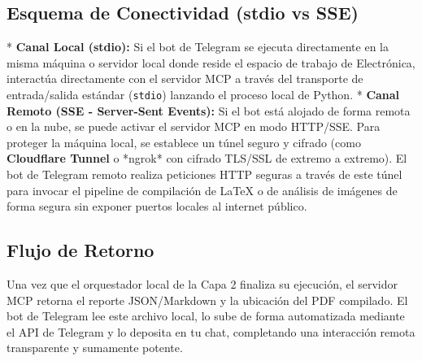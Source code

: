 \documentclass[12pt,a4paper]{article}
\begin{document}
\subsection{Esquema de Conectividad (stdio vs SSE)}
* \textbf{Canal Local (stdio):} Si el bot de Telegram se ejecuta directamente en la misma máquina o servidor local donde reside el espacio de trabajo de Electrónica, interactúa directamente con el servidor MCP a través del transporte de entrada/salida estándar (\texttt{stdio}) lanzando el proceso local de Python.
* \textbf{Canal Remoto (SSE - Server-Sent Events):} Si el bot está alojado de forma remota o en la nube, se puede activar el servidor MCP en modo HTTP/SSE. Para proteger la máquina local, se establece un túnel seguro y cifrado (como \textbf{Cloudflare Tunnel} o *ngrok* con cifrado TLS/SSL de extremo a extremo). El bot de Telegram remoto realiza peticiones HTTP seguras a través de este túnel para invocar el pipeline de compilación de LaTeX o de análisis de imágenes de forma segura sin exponer puertos locales al internet público.

\subsection{Flujo de Retorno}
Una vez que el orquestador local de la Capa 2 finaliza su ejecución, el servidor MCP retorna el reporte JSON/Markdown y la ubicación del PDF compilado. El bot de Telegram lee este archivo local, lo sube de forma automatizada mediante el API de Telegram y lo deposita en tu chat, completando una interacción remota transparente y sumamente potente.
\end{document}
